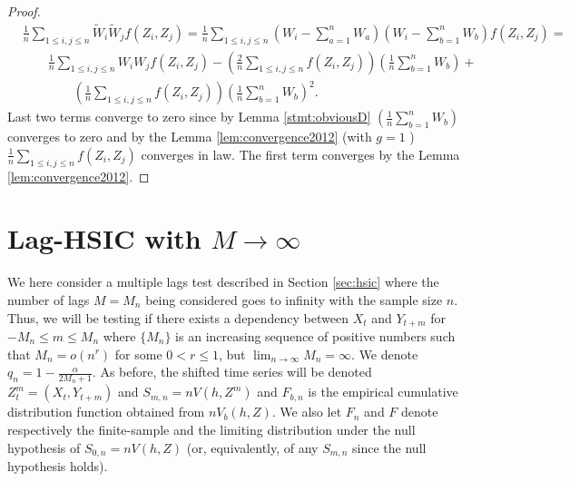 \begin{proof}
\begin{align}
&\frac 1 n \sum_{1 \leq i,j \leq n} \tilde W_i \tilde W_j f(Z_i,Z_j) = \frac 1 n \sum_{1 \leq i,j \leq n} \left( W_i - \sum_{a=1}^n W_a \right) \left( W_i - \sum_{b=1}^n W_b \right) f(Z_i,Z_j) =\\
& \quad \quad \frac 1 n    \sum_{1 \leq i,j \leq n} W_i W_j f(Z_i,Z_j)  - \left( \frac 2 n \sum_{1 \leq i,j \leq n} f(Z_i,Z_j) \right) \left( \frac 1 n \sum_{b=1}^n W_b \right)  + \\
& \quad \quad\quad \quad \left( \frac 1 n   \sum_{1 \leq i,j \leq n} f(Z_i,Z_j) \right) \left( \frac 1 n \sum_{b=1}^n W_b \right)^2.
\end{align}
Last two terms converge to zero since by Lemma \ref{stmt:obviousD} $\left( \frac 1 n \sum_{b=1}^n W_b \right)$ converges to zero and  by the Lemma \ref{lem:convergence2012} (with $g=1$ ) $\frac 1 n  \sum_{1 \leq i,j \leq n} f(Z_i,Z_j)$ converges in law. The first term converges by the Lemma \ref{lem:convergence2012}. 
\end{proof}




\section{Lag-HSIC with $M \to \infty$}

We here consider a multiple lags test described in Section \ref{sec:hsic} where the number of lags $M=M_n$ being considered goes to infinity with the sample size $n$. Thus, we will be testing if there exists a dependency between $X_t$ and $Y_{t+m}$ for $-M_n \leq m \leq M_n$ where $\{M_n\}$ is an increasing sequence of positive numbers such that $M_n=o(n^r)$ for some $0<r\leq 1$, but $\lim_{n\to\infty}M_n=\infty$. 
We denote $q_{n} = 1-\frac{\alpha}{2M_n+1}$. As before, the shifted time series will be denoted $Z_t^m =(X_t,Y_{t+m})$ and $S_{m,n}=n V(h,Z^m)$ and $F_{b,n}$ is the empirical cumulative distribution function obtained from $n V_b(h,Z)$. We also let $F_n$ and $F$ denote respectively the finite-sample and the limiting distribution under the null hypothesis of $S_{0,n} = n V(h,Z)$ (or, equivalently, of any $S_{m,n}$ since the null hypothesis holds).

